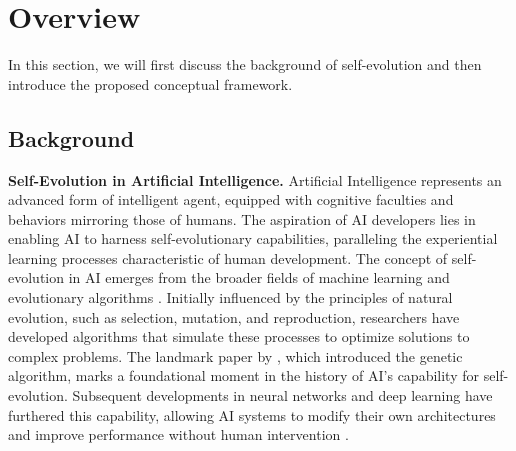\documentclass[sn-basic, Numbered]{sn-jnl}%
\theoremstyle{thmstyleone}%
\theoremstyle{thmstyletwo}%
\theoremstyle{thmstylethree}%
\begin{document}
\section{Overview}
\label{sec:overview}
In this section, we will first discuss the background of self-evolution and then introduce the proposed conceptual framework.

\subsection{Background}

\noindent\textbf{Self-Evolution in Artificial Intelligence.}
Artificial Intelligence represents an advanced form of intelligent agent, equipped with cognitive faculties and behaviors mirroring those of humans. The aspiration of AI developers lies in enabling AI to harness self-evolutionary capabilities, paralleling the experiential learning processes characteristic of human development.
The concept of self-evolution in AI emerges from the broader fields of machine learning and evolutionary algorithms \cite{back1993overview}. Initially influenced by the principles of natural evolution, such as selection, mutation, and reproduction, researchers have developed algorithms that simulate these processes to optimize solutions to complex problems. The landmark paper by \citet{holland1992adaptation}, which introduced the genetic algorithm, marks a foundational moment in the history of AI's capability for self-evolution. Subsequent developments in neural networks and deep learning have furthered this capability, allowing AI systems to modify their own architectures and improve performance without human intervention \cite{liu2021survey}. 
\end{document}
